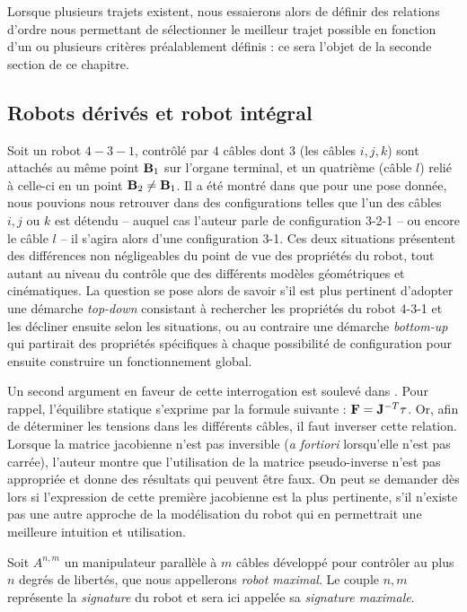 Lorsque plusieurs trajets existent, nous essaierons alors de définir 
des relations d'ordre nous permettant de sélectionner le meilleur trajet 
possible en fonction d'un ou plusieurs critères préalablement définis : ce sera 
l'objet de la seconde section de ce chapitre.

\subsection{Robots d\'eriv\'es et robot int\'egral}

Soit un robot $4-3-1$, contrôlé par $4$ câbles dont $3$ (les câbles $i, j, k$) 
sont attachés au même point ${\bf B}_1$ sur l'organe terminal, et un quatrième 
(câble $l$) relié à celle-ci en un point ${\bf B}_2 \neq {\bf B}_1$. Il a été 
montré dans \cite{merlet2013-431} que pour une pose donnée, nous pouvions 
nous 
retrouver dans des configurations telles que l'un des câbles $i, j$ ou $k$ est 
détendu -- auquel cas l'auteur parle de configuration 3-2-1 -- ou encore le 
câble $l$ -- il s'agira alors d'une configuration 3-1. Ces deux situations 
présentent des différences non négligeables du point de vue des propriétés du 
robot, tout autant au niveau du contrôle que des différents modèles géométriques 
et cinématiques. La question se pose alors de savoir s'il est plus pertinent 
d'adopter une démarche {\it top-down} consistant à rechercher les propriétés du 
robot 4-3-1 et les décliner ensuite selon les situations, ou au contraire une 
démarche {\it bottom-up} qui partirait des propriétés spécifiques à chaque 
possibilité de configuration pour ensuite construire un fonctionnement global.

Un second argument en faveur de cette interrogation est soulevé 
dans \cite{merlet2012}. Pour rappel, l'équilibre statique s'exprime par la 
formule suivante : $\mathcal {\bf F} = {\bf J}^{-T} {\bf \tau}$. Or, afin de 
déterminer les tensions dans les différents câbles, il faut inverser cette 
relation. Lorsque la matrice jacobienne n'est pas inversible ({\it a fortiori} 
lorsqu'elle n'est pas carrée), l'auteur montre que l'utilisation de la matrice 
pseudo-inverse n'est pas appropriée et donne des résultats qui peuvent être 
faux. On peut se demander dès lors si l'expression de cette première jacobienne 
est la plus pertinente, s'il n'existe pas une autre approche de la modélisation 
du robot qui en permettrait une meilleure intuition et utilisation.

Soit $A^{n, m}$ un manipulateur parall\`ele \`a $m$ c\^ables d\'evelopp\'e pour 
contr\^oler au plus $n$ degr\'es de libert\'es, que nous appellerons {\it 
robot maximal}. Le couple ${n, m}$ repr\'esente la {\it signature} du robot et 
sera ici appel\'ee sa {\it signature maximale}.

